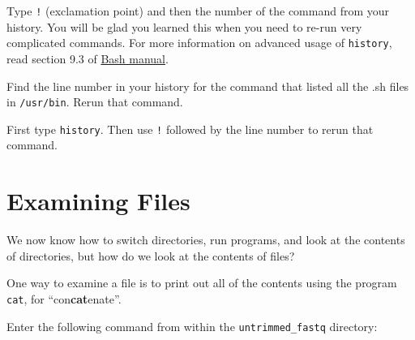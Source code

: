 \documentclass[
  letterpaper,
  DIV=11,
  numbers=noendperiod]{scrreprt}
\newenvironment{Shaded}{\begin{snugshade}}{\end{snugshade}}
\newcommand{\ExtensionTok}[1]{\textcolor[rgb]{0.00,0.23,0.31}{#1}}
\newcommand{\NormalTok}[1]{\textcolor[rgb]{0.00,0.23,0.31}{#1}}
\begin{document}
Type \texttt{!} (exclamation point) and then the number of the command
from your history. You will be glad you learned this when you need to
re-run very complicated commands. For more information on advanced usage
of \texttt{history}, read section 9.3 of
\href{https://www.gnu.org/software/bash/manual/html_node/index.html}{Bash
manual}.

\begin{tcolorbox}[enhanced jigsaw, opacitybacktitle=0.6, colback=white, coltitle=black, opacityback=0, rightrule=.15mm, toptitle=1mm, toprule=.15mm, bottomtitle=1mm, colframe=quarto-callout-caution-color-frame, arc=.35mm, titlerule=0mm, colbacktitle=quarto-callout-caution-color!10!white, leftrule=.75mm, title={Exercise}, breakable, bottomrule=.15mm, left=2mm]

Find the line number in your history for the command that listed all the
.sh files in \texttt{/usr/bin}. Rerun that command.

\end{tcolorbox}

\begin{tcolorbox}[enhanced jigsaw, opacitybacktitle=0.6, colback=white, coltitle=black, opacityback=0, rightrule=.15mm, toptitle=1mm, toprule=.15mm, bottomtitle=1mm, colframe=quarto-callout-caution-color-frame, arc=.35mm, titlerule=0mm, colbacktitle=quarto-callout-caution-color!10!white, leftrule=.75mm, title={Solution}, breakable, bottomrule=.15mm, left=2mm]

First type \texttt{history}. Then use \texttt{!} followed by the line
number to rerun that command.

\end{tcolorbox}

\section{Examining Files}\label{examining-files}

We now know how to switch directories, run programs, and look at the
contents of directories, but how do we look at the contents of files?

One way to examine a file is to print out all of the contents using the
program \texttt{cat}, for ``con\textbf{cat}enate''.

Enter the following command from within the \texttt{untrimmed\_fastq}
directory:

\begin{Shaded}
\end{Shaded}
\end{document}
